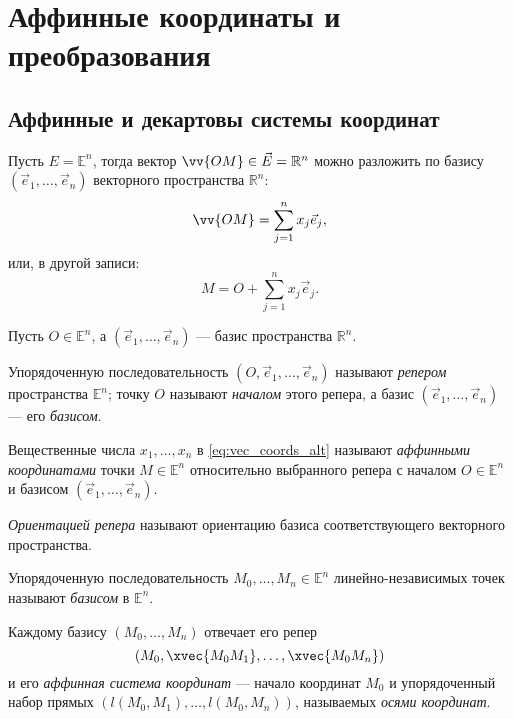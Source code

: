\section{Аффинные координаты и преобразования}

\subsection{Аффинные и декартовы системы координат}

Пусть $E = \mathbb{E}^n$, тогда вектор $\vv{OM} \in \vec{E} = \mathbb{R}^n$
можно разложить по базису $(\vec{e}_1, \dots, \vec{e}_n)$ векторного
пространства $\mathbb{R}^n$:
\begin{equation}
  \label{eq:vec_coords}
  \vv{OM} = \sum_{j=1}^n x_j \vec{e}_j,
\end{equation}
или, в другой записи:
\begin{equation}
  \label{eq:vec_coords_alt}
  M = O + \sum_{j=1}^n x_j \vec{e}_j.
\end{equation}

Пусть $O \in \mathbb{E}^n$, а $(\vec{e}_1, \dots, \vec{e}_n)$ --- базис
пространства $\mathbb{R}^n$.
\begin{definition}
  Упорядоченную последовательность $(O, \vec{e}_1, \dots, \vec{e}_n)$ называют
  \textit{репером} пространства $\mathbb{E}^n$; точку $O$ называют
  \textit{началом} этого репера, а базис $(\vec{e}_1, \dots, \vec{e}_n)$ ---
  его \textit{базисом}.
\end{definition}

\begin{definition}
  Вещественные числа $x_1, \dots, x_n$ в \ref{eq:vec_coords_alt} называют
  \textit{аффинными координатами} точки $M \in \mathbb{E}^n$ относительно
  выбранного репера с началом $O \in \mathbb{E}^n$ и базисом
  $(\vec{e}_1, \dots, \vec{e}_n)$.
\end{definition}

\begin{definition}
  \textit{Ориентацией репера} называют ориентацию базиса соответствующего
  векторного пространства.
\end{definition}

\begin{definition}
  Упорядоченную последовательность $M_0, \dots, M_n \in \mathbb{E}^n$
  линейно-независимых точек называют \textit{базисом} в $\mathbb{E}^n$.
\end{definition}

\begin{remark}
  Каждому базису $(M_0, \dots, M_n)$ отвечает его репер
  \begin{equation*}
    (M_0, \xvec{M_0 M_1}, \dots, \xvec{M_0 M_n})
  \end{equation*}
  и его \textit{аффинная система координат} --- начало
  координат $M_0$ и упорядоченный набор прямых $( l(M_0, M_1), \dots,
  l(M_0, M_n) )$, называемых \textit{осями координат}.
\end{remark}

